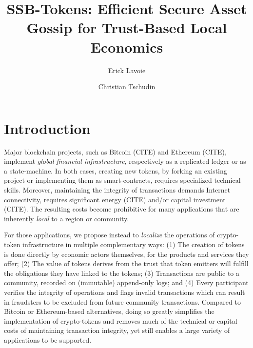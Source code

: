 \documentclass[sigplan,screen,10pt]{acmart}
\begin{document}
\title{SSB-Tokens: Efficient Secure Asset Gossip for Trust-Based Local Economics}

\author{Erick Lavoie}

\author{Christian Tschudin}


\begin{abstract}

\end{abstract}

\maketitle

\section{Introduction}

Major blockchain projects, such as Bitcoin (CITE) and Ethereum (CITE), implement \textit{global financial infrastructure}, respectively as a replicated ledger or as a state-machine. In both cases, creating new tokens, by forking an existing project or implementing them as smart-contracts, requires specialized technical skills. Moreover, maintaining the integrity of transactions demands Internet connectivity, requires significant energy (CITE) and/or capital investment (CITE). The resulting costs become prohibitive for many applications that are inherently \textit{local} to a region or community.

For those applications, we propose instead to \textit{localize} the operations of crypto-token infrastructure in multiple complementary ways: (1) The creation of tokens is done directly by economic actors themselves, for the products and services they offer; (2) The value of tokens derives from the trust that token emitters will fulfill the obligations they have linked to the tokens; (3) Transactions are public to a community, recorded on (immutable) append-only logs; and (4) Every participant verifies the integrity of operations and flags invalid transactions which can result in fraudsters to be excluded from future community transactions. Compared to Bitcoin or Ethereum-based alternatives, doing so greatly simplifies the implementation of crypto-tokens and removes much of the technical or capital costs of maintaining transaction integrity, yet still enables a large variety of applications to be supported.
\end{document}
